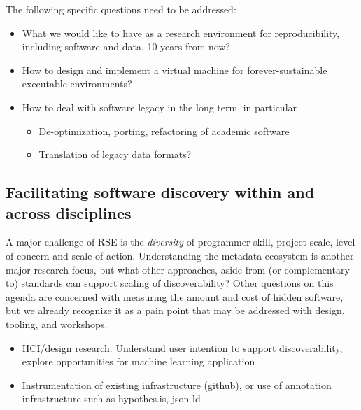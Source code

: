 \documentclass[a4paper,UKenglish]{dagman}
\begin{document}
The following specific questions need to be addressed:

\begin{itemize}
\item What we would like to have as a research environment for reproducibility, including  software and data, 10 years from now? 
\item How to design and implement a virtual machine for forever-sustainable executable environments? 
\item How to deal with software legacy in the long term, in particular
    \begin{itemize}
    \item De-optimization, porting, refactoring of academic software
    \item Translation of legacy data formats?
    \end{itemize}
\end{itemize}



\subsection{Facilitating software discovery within and across disciplines}


A major challenge of RSE is the \emph{diversity} of programmer skill, project scale, level of concern and scale of action. Understanding the metadata ecosystem is another major research focus, but what other approaches, aside from (or complementary to) standards can support scaling of discoverability? Other questions on this agenda are concerned with measuring the amount and cost of hidden software, but we already recognize it as a pain point that may be addressed with design, tooling, and workshops.


\begin{itemize}
\item HCI/design research: Understand user intention to support discoverability, explore opportunities for machine learning application
\item Instrumentation of existing infrastructure (github), or use of annotation infrastructure such as hypothes.is, json-ld
\end{itemize}
\end{document}
